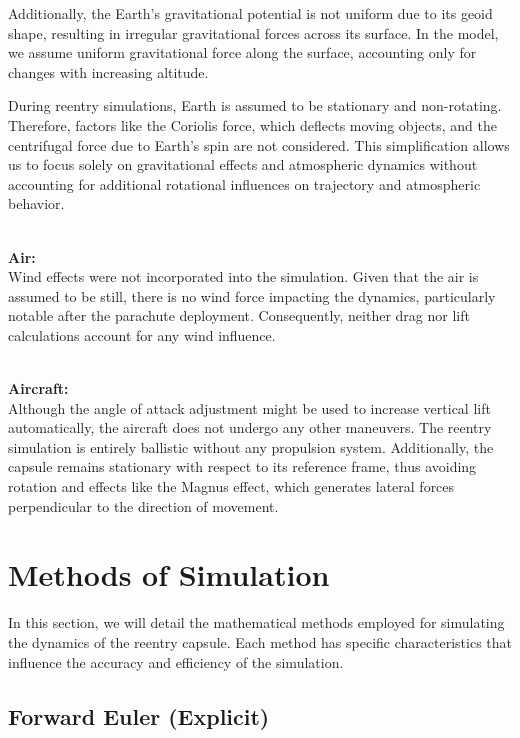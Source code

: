 \documentclass[runningheads]{llncs}
\begin{document}
Additionally, the Earth's gravitational potential is not uniform due to its geoid shape, resulting in irregular gravitational forces across its surface. In the model, we assume uniform gravitational force along the surface, accounting only for changes with increasing altitude.

During reentry simulations, Earth is assumed to be stationary and non-rotating. Therefore, factors like the Coriolis force, which deflects moving objects, and the centrifugal force due to Earth's spin are not considered. This simplification allows us to focus solely on gravitational effects and atmospheric dynamics without accounting for additional rotational influences on trajectory and atmospheric behavior.


\textbf{\\Air:\\}
Wind effects were not incorporated into the simulation. Given that the air is assumed to be still, there is no wind force impacting the dynamics, particularly notable after the parachute deployment. Consequently, neither drag nor lift calculations account for any wind influence.

\textbf{\\Aircraft:\\}
Although the angle of attack adjustment might be used to increase vertical lift automatically, the aircraft does not undergo any other maneuvers. The reentry simulation is entirely ballistic without any propulsion system. Additionally, the capsule remains stationary with respect to its reference frame, thus avoiding rotation and effects like the Magnus effect, which generates lateral forces perpendicular to the direction of movement.









\section{Methods of Simulation}
In this section, we will detail the mathematical methods employed for simulating the dynamics of the reentry capsule. Each method has specific characteristics that influence the accuracy and efficiency of the simulation.


\subsection{Forward Euler (Explicit)}
\end{document}
